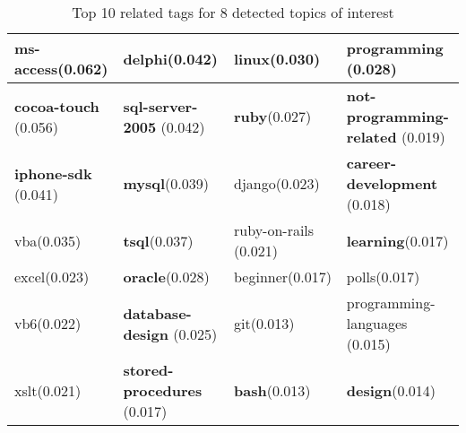 \begin{sidewaystable}
\begin{tabular}{|l|l|l|l|}
\hline
 ms-access(0.062)& delphi(0.042)& \textbf{linux}(0.030)& programming (0.028) \\ 
\hline
 \textbf{cocoa-touch} (0.056)& \textbf{sql-server-2005} (0.042)& \textbf{ruby}(0.027)& \textbf{not-programming-related} (0.019) \\ 
\hline
 \textbf{iphone-sdk} (0.041)& \textbf{mysql}(0.039)& django(0.023)& \textbf{career-development} (0.018) \\ 
\hline
 vba(0.035)& \textbf{tsql}(0.037)& ruby-on-rails (0.021)& \textbf{learning}(0.017) \\ 
\hline
 excel(0.023)& \textbf{oracle}(0.028)& beginner(0.017)& polls(0.017) \\ 
\hline
 vb6(0.022)& \textbf{database-design} (0.025)& git(0.013)& programming-languages (0.015) \\ 
\hline
 xslt(0.021)& \textbf{stored-procedures} (0.017)& \textbf{bash}(0.013)& \textbf{design}(0.014) \\ 
\hline
\end{tabular}
\caption{Top 10 related tags for 8 detected topics of interest}
\label{tab:ldaresult1}
\end{sidewaystable}

